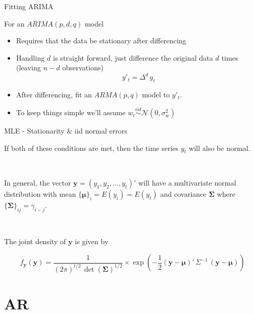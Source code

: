 \documentclass[11pt,ignorenonframetext,]{beamer}
\begin{document}
\begin{frame}[t]{%
\protect\hypertarget{fitting-arima}{%
Fitting ARIMA}}

For an \(ARIMA(p,d,q)\) model

\begin{itemize}
\item
  Requires that the data be stationary after differencing \vspace{3mm}
\item
  Handling \(d\) is straight forward, just difference the original data
  \(d\) times (leaving \(n-d\) observations)
  \[ y'_t = \Delta^d \, y_t \] \vspace{3mm}
\item
  After differencing, fit an \(ARMA(p,q)\) model to \(y'_t\).
  \vspace{3mm}
\item
  To keep things simple we’ll assume
  \(w_t \overset{iid}{\sim} \mathcal{N}(0,\sigma^2_w)\)
\end{itemize}

\end{frame}

\begin{frame}{%
\protect\hypertarget{mle---stationarity-iid-normal-errors}{%
MLE - Stationarity \& iid normal errors}}

If both of these conditions are met, then the time series \(y_t\) will
also be normal.

\pause

\(~\)

In general, the vector \(\symbf{y} = (y_1, y_2, \ldots, y_t)'\) will
have a multivariate normal distribution with mean
\(\{\symbf\mu\}_i = E(y_i) = E(y_t)\) and covariance \(\symbf\Sigma\)
where \(\{\symbf{\Sigma}\}_{ij} = \gamma_{i-j}\).

\(~\)

The joint density of \(\symbf y\) is given by

\[ f_{\symbf y}(\symbf y) = \frac{1}{(2\pi)^{t/2}\,\det(\symbf\Sigma)^{1/2}} \times \exp\left( -\frac{1}{2}(\symbf y - \symbf \mu)' \, \Sigma^{-1} \, (\symbf y - \symbf \mu) \right) \]

\end{frame}

\hypertarget{ar}{%
\section{AR}\label{ar}}
\end{document}
